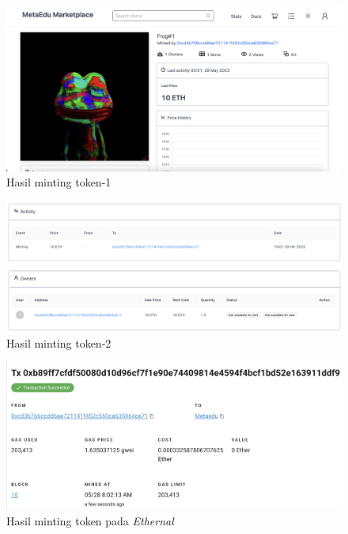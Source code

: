 \begin{itemize}
      \begin{figure} [H] \centering
          \includegraphics[scale=0.3]{gambar/img-test-rent-mint-2.png}
          \caption{Hasil minting token-1}
          \label{fig:TestRentHasilMinting}
        \end{figure}
        \begin{figure} [H] \centering
          \includegraphics[scale=0.3]{gambar/img-test-rent-mint-3.png}
          \caption{Hasil minting token-2}
          \label{fig:TestRentHasilMinting2}
        \end{figure}
        \begin{figure} [H] \centering
          \includegraphics[scale=0.4]{gambar/img-test-rent-mint-4.png}
          \caption{Hasil minting token pada \emph{Ethernal}}
          \label{fig:TestRentHasilMinting3}
        \end{figure}

\end{itemize}
